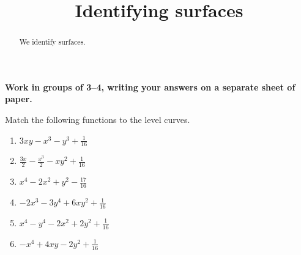 \documentclass[handout,noauthor,nooutcomes]{ximera}
\title[Collaborate:]{Identifying surfaces}
\begin{document}
\begin{abstract}
We identify surfaces.
\end{abstract}
\maketitle

\textbf{Work in groups of 3--4, writing your answers on a separate
  sheet of paper.}

Match the following functions to the level curves. %
\begin{multicols}{2}
\begin{enumerate}
\item $3xy-x^3-y^3+\frac{1}{16}$
\item $\frac{3x}{2} -\frac{x^3}{2} - xy^2+\frac{1}{16}$
\item $x^4-2x^2+y^2-\frac{17}{16}$
\item $-2x^3-3y^4+6xy^2+\frac{1}{16}$
\item $x^4-y^4-2x^2+2y^2+\frac{1}{16}$
\item $-x^4+4xy-2y^2+ \frac{1}{16}$
\end{enumerate}
\end{multicols}
\end{document}

